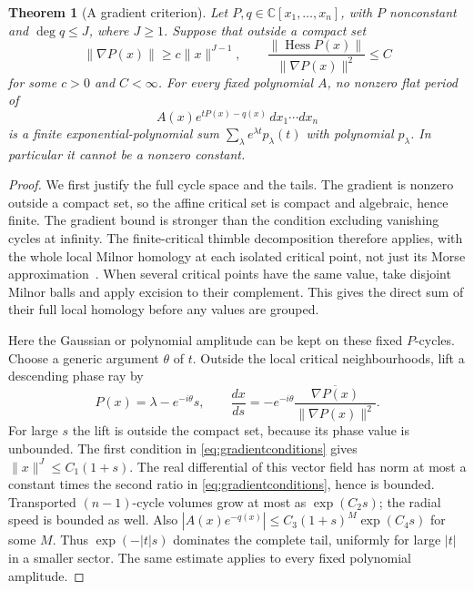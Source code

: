 \documentclass[11pt]{article}
\newtheorem{theorem}{Theorem}[section]
\theoremstyle{definition}\newtheorem{definition}[theorem]{Definition}
\theoremstyle{remark}\newtheorem{remark}[theorem]{Remark}
\newcommand{\C}{\mathbb C}
\begin{document}
\begin{theorem}[A gradient criterion]\label{thm:gradientcriterion}
Let $P,q\in\C[x_1,\ldots,x_n]$, with $P$ nonconstant and
$\deg q\leq J$, where $J\geq1$. Suppose that outside a compact set
\begin{equation}\label{eq:gradientconditions}
 \|\nabla P(x)\|\geq c\|x\|^{J-1},\qquad
 \frac{\|\operatorname{Hess}P(x)\|}{\|\nabla P(x)\|^2}\leq C
\end{equation}
for some $c>0$ and $C<\infty$. For every fixed polynomial $A$,
no nonzero flat period of
\[
 A(x)e^{tP(x)-q(x)}\,dx_1\cdots dx_n
\]
is a finite exponential-polynomial sum
$\sum_\lambda e^{\lambda t}p_\lambda(t)$ with polynomial
$p_\lambda$. In particular it cannot be a nonzero constant.
\end{theorem}
\begin{proof}
We first justify the full cycle space and the tails. The gradient is
nonzero outside a compact set, so the affine critical set is compact
and algebraic, hence finite. The gradient bound is stronger than the
condition excluding vanishing cycles at infinity. The finite-critical
thimble decomposition therefore applies, with the whole local Milnor
homology at each isolated critical point, not just its Morse
approximation~\cite[Part~I, Sections~1--4]{Pham}.
When several critical points have the same value, take disjoint
Milnor balls and apply excision to their complement. This gives the
direct sum of their full local homology before any values are grouped.

Here the Gaussian or polynomial amplitude can be kept on these fixed
$P$-cycles. Choose a generic argument $\theta$ of $t$. Outside the
local critical neighbourhoods, lift a descending phase ray by
\[
 P(x)=\lambda-e^{-i\theta}s,\qquad
 \frac{dx}{ds}=-e^{-i\theta}
                    \frac{\overline{\nabla P(x)}}{\|\nabla P(x)\|^2}.
\]
For large $s$ the lift is outside the compact set, because its phase
value is unbounded. The first condition in
\eqref{eq:gradientconditions} gives
$\|x\|^J\leq C_1(1+s)$. The real differential of this vector field
has norm at most a constant times the second ratio in
\eqref{eq:gradientconditions}, hence is bounded. Transported
$(n-1)$-cycle volumes grow at most as $\exp(C_2s)$; the radial speed
is bounded as well. Also
$|A(x)e^{-q(x)}|\leq C_3(1+s)^M\exp(C_4s)$ for some $M$.
Thus $\exp(-|t|s)$ dominates the complete tail, uniformly for large
$|t|$ in a smaller sector. The same estimate applies to every fixed
polynomial amplitude.


\end{proof}
\end{document}
